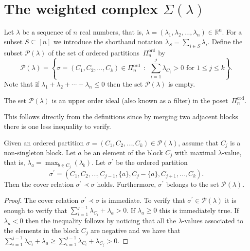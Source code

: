 \documentclass[ALCO,ThmDefs,Unicode,epreuves]{cedram}
\newcommand{\Rrr}{\mathbb{R}}
\DeclareMathOperator{\ord}{ord}
\newcommand{\coveredby}{\prec}
\newcommand{\Qn}{\Pi^{\ord}_{n}}
\newcommand{\lambdasumnonpositive}
{\lambda_{1} + \lambda_{2} + \cdots + \lambda_{n} \leq 0}
\begin{document}
\section{The weighted complex \texorpdfstring{$\Sigma(\lambda)$}{Sigma(lambda)}}
\label{section_the_weighted_complex}

Let $\lambda$ be a sequence of $n$ real numbers,
that is, $\lambda = (\lambda_{1}, \lambda_{2}, \ldots, \lambda_{n}) \in \Rrr^{n}$.
For a subset $S \subseteq [n]$ we introduce the shorthand notation
$\lambda_{S} = \sum_{i \in S} \lambda_{i}$.
Define the subset $\mathcal{P}(\lambda)$ of the set of ordered 
partitions~$\Qn$ by
$$
\mathcal{P}(\lambda)
=
\left\{ \sigma = (C_{1}, C_{2}, \ldots, C_{k}) \in \Qn \:\: : \:\:
\sum_{i=1}^{j} \lambda_{C_{i}} > 0 \text{ for } 1 \leq j \leq k \right\} .
$$
Note that if $\lambdasumnonpositive$
then the set $\mathcal{P}(\lambda)$ is empty.


\begin{lemma}
The set $\mathcal{P}(\lambda)$ is an upper order ideal (also
known as a filter)
in the poset~$\Qn$.
\end{lemma}
This follows directly from the definitions
since by merging two adjacent blocks
there is one less inequality to verify.

\begin{lemma}
Given an ordered partition
$\sigma = (C_{1}, C_{2}, \ldots, C_{k}) \in \mathcal{P}(\lambda)$,
assume that $C_{j}$ is a non-singleton block.
Let $a$ be an element of the block $C_{j}$
with maximal $\lambda$-value,
that is,
$\lambda_{a} = \max_{b \in C_{j}}(\lambda_{b})$.
Let $\sigma^{\prime}$ be the ordered partition
$$
\sigma^{\prime}
=
(C_{1}, C_{2}, \ldots, C_{j-1}, \{a\}, C_{j} - \{a\}, C_{j+1}, \ldots, C_{k}) .
$$
Then the cover relation $\sigma^{\prime} \coveredby \sigma$ holds.
Furthermore, $\sigma^{\prime}$ belongs to the set $\mathcal{P}(\lambda)$.
\label{lemma_split}
\end{lemma}
\begin{proof}
The cover relation $\sigma^{\prime} \coveredby \sigma$ is immediate.
To verify that
$\sigma^{\prime} \in \mathcal{P}(\lambda)$
it is enough to verify that
$\sum_{i=1}^{j-1} \lambda_{C_{i}} + \lambda_{a} > 0$.
If $\lambda_{a} \geq 0$ this is immediately true.
If $\lambda_{a} < 0$ then
the inequality follows by noticing that all the 
$\lambda$-values associated to
the elements in the block $C_{j}$
are negative and we have that
$\sum_{i=1}^{j-1} \lambda_{C_{i}} + \lambda_{a} \geq
\sum_{i=1}^{j-1} \lambda_{C_{i}} + \lambda_{C_{j}} > 0$.
\end{proof}
\end{document}
